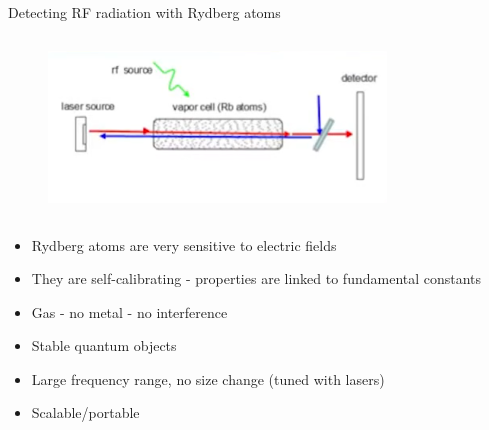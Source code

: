 \begin{columnframe}{Detecting RF radiation with Rydberg atoms}
    \begin{column}{0.5\textwidth}
        \begin{figure}
            \centering
            \includegraphics[width=0.8\textwidth]{images/detection_diagram.png}
        \end{figure}
    \end{column}
    \begin{column}{0.5\textwidth}
        \begin{itemize}
            \item Rydberg atoms are very sensitive to electric fields
            \item They are self-calibrating - properties are linked to fundamental constants
            \item Gas - no metal - no interference
            \item Stable quantum objects
            \item Large frequency range, no size change (tuned with lasers)
            \item Scalable/portable
        \end{itemize}
    \end{column}
\end{columnframe}

